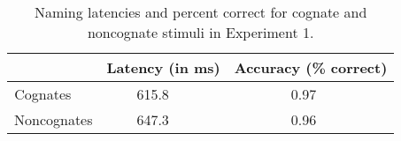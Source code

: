 \begin{table}[hptb]
\begin{center}
\begin{tabular}{|c|c|c|} \hline
\multicolumn{1}{|c|}{}&\multicolumn{1}{c|}{Latency (in ms)}&\multicolumn{1}{c|}{Accuracy (\% correct)}\\ \hline
Cognates~~~&615.8~~~&0.97~~\\ 
Noncognates&647.3~~~&0.96~~\\ 
\hline
\end{tabular}
\caption{Naming latencies and percent correct for cognate and noncognate stimuli in Experiment 1.}\label{OOC_latencies}
\end{center}

\end{table}
